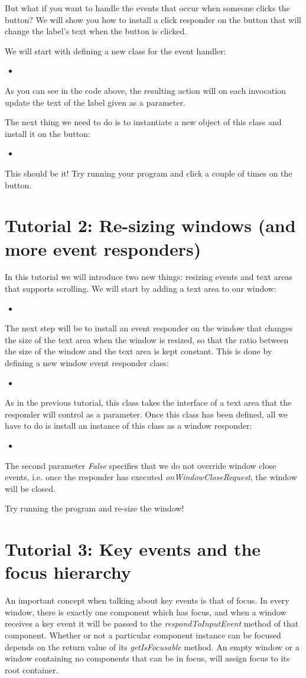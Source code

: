 \documentclass[a4paper]{article}
\newcommand{\timbercode}[2]
  {\begin{itemize}\item[]\end{itemize}}
\begin{document}
But what if you want to handle the events that occur when someone clicks the button? We will show you how to install a click responder on the button that will change the label's text when the button is clicked.

We will start with defining a new class for the event handler:
\timbercode{tutorial1part2}{}

As you can see in the code above, the resulting action will on each invocation update the text of the label given as a parameter.

The next thing we need to do is to instantiate a new object of this class and install it on the button:
\timbercode{tutorial1part3}{}

This should be it! Try running your program and click a couple of times on the button.

\section*{Tutorial 2: Re-sizing windows (and more event responders)}
In this tutorial we will introduce two new things: resizing events and text areas that supports scrolling. We will start by adding a text area to our window:
\timbercode{tutorial2part0}{}

The next step will be to install an event responder on the window that changes the size of the text area when the window is resized, so that the ratio between the size of the window and the text area is kept constant. This is done by defining a new window event responder class:
\timbercode{tutorial2part1}{}

As in the previous tutorial, this class takes the interface of a text area that the responder will control as a parameter. Once this class has been defined, all we have to do is install an instance of this class as a window responder:
\timbercode{tutorial2part2}{}
The second parameter \textit{False} specifies that we do not override window close events, i.e. once the responder has executed \textit{onWindowCloseRequest}, the window will be closed.

Try running the program and re-size the window!

\section*{Tutorial 3: Key events and the focus hierarchy}
An important concept when talking about key events is that of focus. In every window, there is exactly one component which has focus, and when a window receives a key event it will be passed to the \textit{respondToInputEvent} method of that component. Whether or not a particular component instance can be focused depends on the return value of its \textit{getIsFocusable} method. An empty window or a window containing no components that can be in focus, will assign focus to its root container.
\end{document}
